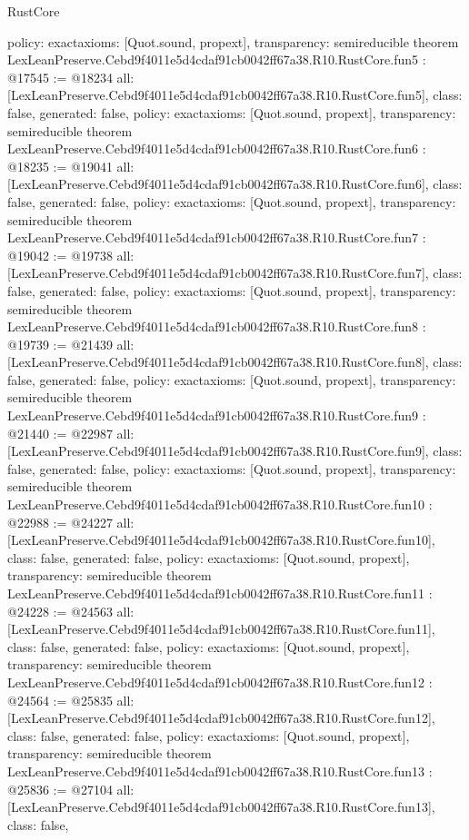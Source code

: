 \begin{lexlean}{RustCore}
\begin{coremodule}
{  policy: exact{axioms: [Quot.sound, propext]},
  transparency: semireducible
}
theorem LexLeanPreserve.Cebd9f4011e5d4cdaf91cb0042ff67a38.R10.RustCore.fun5 : @17545 := @18234 {
  all: [LexLeanPreserve.Cebd9f4011e5d4cdaf91cb0042ff67a38.R10.RustCore.fun5],
  class: false,
  generated: false,
  policy: exact{axioms: [Quot.sound, propext]},
  transparency: semireducible
}
theorem LexLeanPreserve.Cebd9f4011e5d4cdaf91cb0042ff67a38.R10.RustCore.fun6 : @18235 := @19041 {
  all: [LexLeanPreserve.Cebd9f4011e5d4cdaf91cb0042ff67a38.R10.RustCore.fun6],
  class: false,
  generated: false,
  policy: exact{axioms: [Quot.sound, propext]},
  transparency: semireducible
}
theorem LexLeanPreserve.Cebd9f4011e5d4cdaf91cb0042ff67a38.R10.RustCore.fun7 : @19042 := @19738 {
  all: [LexLeanPreserve.Cebd9f4011e5d4cdaf91cb0042ff67a38.R10.RustCore.fun7],
  class: false,
  generated: false,
  policy: exact{axioms: [Quot.sound, propext]},
  transparency: semireducible
}
theorem LexLeanPreserve.Cebd9f4011e5d4cdaf91cb0042ff67a38.R10.RustCore.fun8 : @19739 := @21439 {
  all: [LexLeanPreserve.Cebd9f4011e5d4cdaf91cb0042ff67a38.R10.RustCore.fun8],
  class: false,
  generated: false,
  policy: exact{axioms: [Quot.sound, propext]},
  transparency: semireducible
}
theorem LexLeanPreserve.Cebd9f4011e5d4cdaf91cb0042ff67a38.R10.RustCore.fun9 : @21440 := @22987 {
  all: [LexLeanPreserve.Cebd9f4011e5d4cdaf91cb0042ff67a38.R10.RustCore.fun9],
  class: false,
  generated: false,
  policy: exact{axioms: [Quot.sound, propext]},
  transparency: semireducible
}
theorem LexLeanPreserve.Cebd9f4011e5d4cdaf91cb0042ff67a38.R10.RustCore.fun10 : @22988 := @24227 {
  all: [LexLeanPreserve.Cebd9f4011e5d4cdaf91cb0042ff67a38.R10.RustCore.fun10],
  class: false,
  generated: false,
  policy: exact{axioms: [Quot.sound, propext]},
  transparency: semireducible
}
theorem LexLeanPreserve.Cebd9f4011e5d4cdaf91cb0042ff67a38.R10.RustCore.fun11 : @24228 := @24563 {
  all: [LexLeanPreserve.Cebd9f4011e5d4cdaf91cb0042ff67a38.R10.RustCore.fun11],
  class: false,
  generated: false,
  policy: exact{axioms: [Quot.sound, propext]},
  transparency: semireducible
}
theorem LexLeanPreserve.Cebd9f4011e5d4cdaf91cb0042ff67a38.R10.RustCore.fun12 : @24564 := @25835 {
  all: [LexLeanPreserve.Cebd9f4011e5d4cdaf91cb0042ff67a38.R10.RustCore.fun12],
  class: false,
  generated: false,
  policy: exact{axioms: [Quot.sound, propext]},
  transparency: semireducible
}
theorem LexLeanPreserve.Cebd9f4011e5d4cdaf91cb0042ff67a38.R10.RustCore.fun13 : @25836 := @27104 {
  all: [LexLeanPreserve.Cebd9f4011e5d4cdaf91cb0042ff67a38.R10.RustCore.fun13],
  class: false,
}
\end{coremodule}
\end{lexlean}
